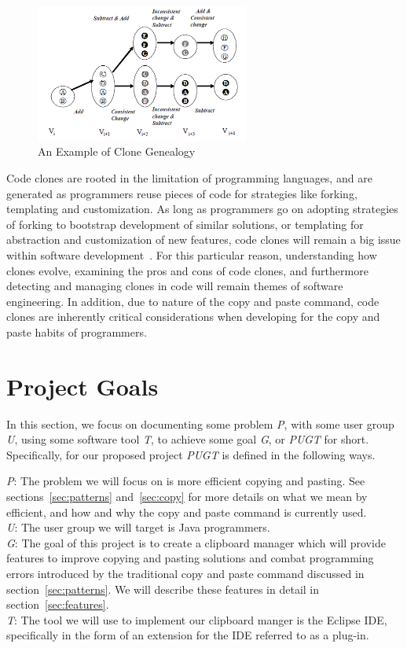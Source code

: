 \documentclass{acm_proc_article-sp}
\begin{document}
\begin{figure}[h]
\centering
\includegraphics[width=7cm]{genealogy}
\caption{An Example of Clone Genealogy}
\label{fig:genea}
\end{figure}

Code clones are rooted in the limitation of programming languages, and are generated as programmers reuse pieces of code for strategies like forking, templating and customization. As long as programmers go on adopting strategies of forking to bootstrap development of similar solutions, or templating for abstraction and customization of new features, code clones will remain a big issue within software development~\cite{frontiers}. For this particular reason, understanding how clones evolve, examining the pros and cons of code clones, and furthermore detecting and managing clones in code will remain themes of software engineering. In addition, due to nature of the copy and paste command, code clones are inherently critical considerations when developing for the copy and paste habits of programmers.

\section{Project Goals}\label{sec:goals}

In this section, we focus on documenting some problem \textit{P}, with some user group \textit{U}, using some software tool \textit{T}, to achieve some goal \textit{G}, or \textit{PUGT} for short. Specifically, for our proposed project \textit{PUGT} is defined in the following ways.

\textit{P}: The problem we will focus on is more efficient copying and pasting. See sections~\ref{sec:patterns} and~\ref{sec:copy} for more details on what we mean by efficient, and how and why the copy and paste command is currently used.\\
\textit{U}: The user group we will target is Java programmers.\\
\textit{G}: The goal of this project is to create a clipboard manager which will provide features to improve copying and pasting solutions and combat programming errors introduced by the traditional copy and paste command discussed in section~\ref{sec:patterns}. We will describe these features in detail in section~\ref{sec:features}.\\
\textit{T}: The tool we will use to implement our clipboard manger is the Eclipse IDE, specifically in the form of an extension for the IDE referred to as a plug-in.
\end{document}
